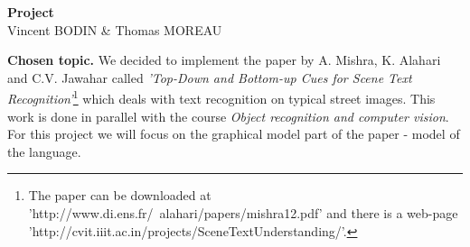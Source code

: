 \documentclass[10pt]{article}
\begin{document}
\begin{center}
\huge\textbf{Project }\normalsize \\
\vspace{0.5cm}
Vincent BODIN \& Thomas MOREAU
\end{center}

\hrulefill
\vspace{1cm}

\textbf{Chosen topic. }We decided to implement the paper by A. Mishra, K. Alahari and C.V. Jawahar called \emph{'Top-Down and Bottom-up Cues for Scene Text Recognition'}\footnote{The paper can be downloaded at 'http://www.di.ens.fr/~alahari/papers/mishra12.pdf' and there is a web-page 'http://cvit.iiit.ac.in/projects/SceneTextUnderstanding/'.} which deals with text recognition on typical street images. This work is done in parallel with the course \emph{Object recognition and computer vision}. For this project we will focus on the graphical model part of the paper - model of the language.\\
\end{document}
